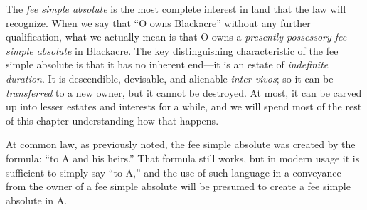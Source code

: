 The \textit{fee simple absolute} is the most complete interest in land that the
law will recognize. When we say that ``O owns Blackacre'' without any further
qualification, what we actually mean is that O owns a \textit{presently
possessory fee simple absolute }in Blackacre. The key distinguishing
characteristic of the fee simple absolute is that it has no inherent end---it
is an estate of \textit{indefinite duration}. It is descendible, devisable, and
alienable \textit{inter vivos}; so it can be \textit{transferred} to a new
owner, but it cannot be destroyed. At most, it can be carved up into lesser
estates and interests for a while, and we will spend most of the rest of this
chapter understanding how that happens.

At common law, as previously noted, the fee simple absolute was created by the
formula: ``to A and his heirs.'' That formula still works, but in modern usage
it is sufficient to simply say ``to A,'' and the use of such language in a
conveyance from the owner of a fee simple absolute will be presumed to create a
fee simple absolute in A.

